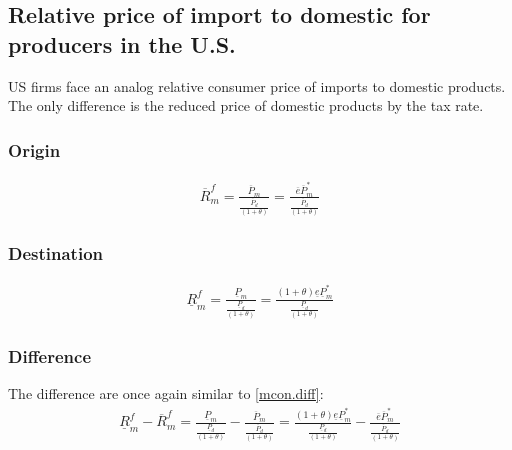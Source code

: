 \subsection*{Relative price of import to domestic for producers in the U.S.}
US firms face an analog relative consumer price of imports to domestic products. The only difference is the reduced price of domestic products by the tax rate.

\subsubsection*{Origin}
\begin{equation}\label{mpro.o}
\begin{aligned}
\overline R^f_m = \frac{\overline P_m}{\frac{\overline P_d}{ \left( 1+\theta \right) }} = \frac{\overline e \overline P^*_m}{\frac{\overline P_d}{ \left( 1+\theta \right) }}
\end{aligned} 
\end{equation}

\subsubsection*{Destination}
\begin{equation}\label{mpro.p}
\begin{aligned}
\underline R^f_m = \frac{\underline P_m}{\frac{\underline P_d}{ \left( 1+\theta \right) }} = \frac{ \left( 1+\theta \right) \underline e \underline P^*_m}{\frac{\underline P_d}{ \left( 1+\theta \right) }}
\end{aligned} 
\end{equation}

\subsubsection*{Difference}
The difference are once again similar to \eqref{mcon.diff}:
\begin{equation}\label{mpro.diff}
\begin{aligned}
\underline R^f_m - \overline R^f_m = \frac{\underline P_m}{\frac{\underline P_d}{ \left( 1+\theta \right) }} - \frac{\overline P_m}{\frac{\overline P_d}{ \left( 1+\theta \right) }} = \frac{ \left( 1+\theta \right) \underline e \underline P^*_m}{\frac{\underline P_d}{ \left( 1+\theta \right) }} - \frac{\overline e \overline P^*_m}{\frac{\overline P_d}{ \left( 1+\theta \right) }}
\end{aligned} 
\end{equation}


